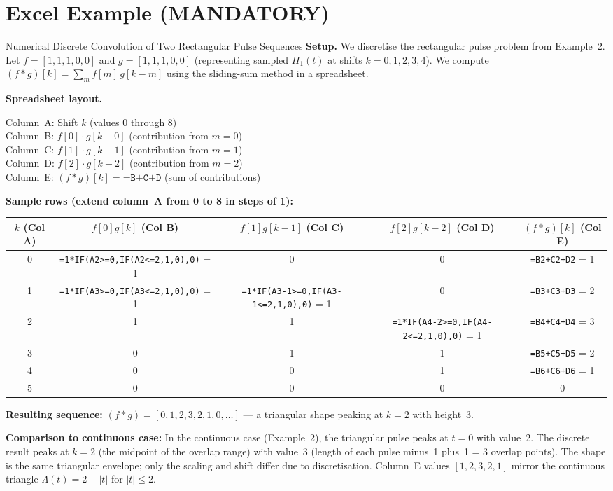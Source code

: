 \documentclass[12pt,a4paper]{article}
\begin{document}
\section{Excel Example (MANDATORY)}

\begin{infobox}{Numerical Discrete Convolution of Two Rectangular Pulse Sequences}
\textbf{Setup.} We discretise the rectangular pulse problem from Example~2.
Let $f = [1,1,1,0,0]$ and $g = [1,1,1,0,0]$ (representing sampled $\Pi_1(t)$
at shifts $k = 0,1,2,3,4$). We compute $(f*g)[k] = \sum_m f[m]\,g[k-m]$
using the sliding-sum method in a spreadsheet.

\medskip
\textbf{Spreadsheet layout.}

Column~A: Shift $k$ (values $0$ through $8$) \\
Column~B: $f[0]\cdot g[k-0]$ (contribution from $m=0$) \\
Column~C: $f[1]\cdot g[k-1]$ (contribution from $m=1$) \\
Column~D: $f[2]\cdot g[k-2]$ (contribution from $m=2$) \\
Column~E: $(f*g)[k] = \texttt{=B+C+D}$ (sum of contributions)

\medskip
\textbf{Sample rows (extend column~A from 0 to 8 in steps of 1):}

\begin{center}
\begin{tabular}{ccccc}
\toprule
$k$ (Col A) & $f[0]g[k]$ (Col B) & $f[1]g[k-1]$ (Col C) & $f[2]g[k-2]$ (Col D) & $(f*g)[k]$ (Col E) \\
\midrule
0 & \texttt{=1*IF(A2>=0,IF(A2<=2,1,0),0)} = 1 & 0 & 0 & \texttt{=B2+C2+D2} = 1 \\
1 & \texttt{=1*IF(A3>=0,IF(A3<=2,1,0),0)} = 1 & \texttt{=1*IF(A3-1>=0,IF(A3-1<=2,1,0),0)} = 1 & 0 & \texttt{=B3+C3+D3} = 2 \\
2 & 1 & 1 & \texttt{=1*IF(A4-2>=0,IF(A4-2<=2,1,0),0)} = 1 & \texttt{=B4+C4+D4} = 3 \\
3 & 0 & 1 & 1 & \texttt{=B5+C5+D5} = 2 \\
4 & 0 & 0 & 1 & \texttt{=B6+C6+D6} = 1 \\
5 & 0 & 0 & 0 & 0 \\
\bottomrule
\end{tabular}
\end{center}

\medskip
\textbf{Resulting sequence:} $(f*g) = [0, 1, 2, 3, 2, 1, 0, \ldots]$ --- a
triangular shape peaking at $k=2$ with height~3.

\medskip
\textbf{Comparison to continuous case:} In the continuous case (Example~2), the
triangular pulse peaks at $t=0$ with value~2. The discrete result peaks at
$k=2$ (the midpoint of the overlap range) with value~3 (length of each pulse
minus~1 plus~1 = 3 overlap points). The shape is the same triangular envelope;
only the scaling and shift differ due to discretisation. Column~E values
$[1,2,3,2,1]$ mirror the continuous triangle $\Lambda(t)=2-|t|$ for $|t|\leq 2$.
\end{infobox}
\end{document}
